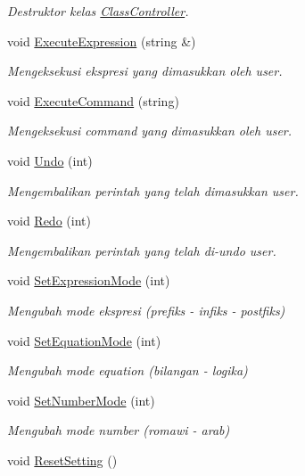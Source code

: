 \begin{DoxyCompactItemize}
\begin{DoxyCompactList}\small\item\em Destruktor kelas \hyperlink{class_class_controller}{Class\+Controller}. \end{DoxyCompactList}\item 
void \hyperlink{class_class_controller_a06cb940d9bfa3a4ec30dcd88c05c2e52}{Execute\+Expression} (string \&)
\begin{DoxyCompactList}\small\item\em Mengeksekusi ekspresi yang dimasukkan oleh user. \end{DoxyCompactList}\item 
void \hyperlink{class_class_controller_a8bee544a3a5f0de7863800aa0ef093f0}{Execute\+Command} (string)
\begin{DoxyCompactList}\small\item\em Mengeksekusi command yang dimasukkan oleh user. \end{DoxyCompactList}\item 
void \hyperlink{class_class_controller_a9caf153dbff2f0be07809b50d52b782f}{Undo} (int)
\begin{DoxyCompactList}\small\item\em Mengembalikan perintah yang telah dimasukkan user. \end{DoxyCompactList}\item 
void \hyperlink{class_class_controller_a4f77c68f3f4418d364aab3eb5cecf26a}{Redo} (int)
\begin{DoxyCompactList}\small\item\em Mengembalikan perintah yang telah di-\/undo user. \end{DoxyCompactList}\item 
void \hyperlink{class_class_controller_a95d115cd68bc470b0c5aefa7aaa33b38}{Set\+Expression\+Mode} (int)
\begin{DoxyCompactList}\small\item\em Mengubah mode ekspresi (prefiks -\/ infiks -\/ postfiks) \end{DoxyCompactList}\item 
void \hyperlink{class_class_controller_aa983bd9a5b63d3d19aa0374d39dda9fc}{Set\+Equation\+Mode} (int)
\begin{DoxyCompactList}\small\item\em Mengubah mode equation (bilangan -\/ logika) \end{DoxyCompactList}\item 
void \hyperlink{class_class_controller_a7522169d820cd667954776ad8dfdba40}{Set\+Number\+Mode} (int)
\begin{DoxyCompactList}\small\item\em Mengubah mode number (romawi -\/ arab) \end{DoxyCompactList}\item 
\hypertarget{class_class_controller_a9e249c8cca0d1f9f55d39050674f9641}{}void \hyperlink{class_class_controller_a9e249c8cca0d1f9f55d39050674f9641}{Reset\+Setting} ()\label{class_class_controller_a9e249c8cca0d1f9f55d39050674f9641}


\end{DoxyCompactItemize}

